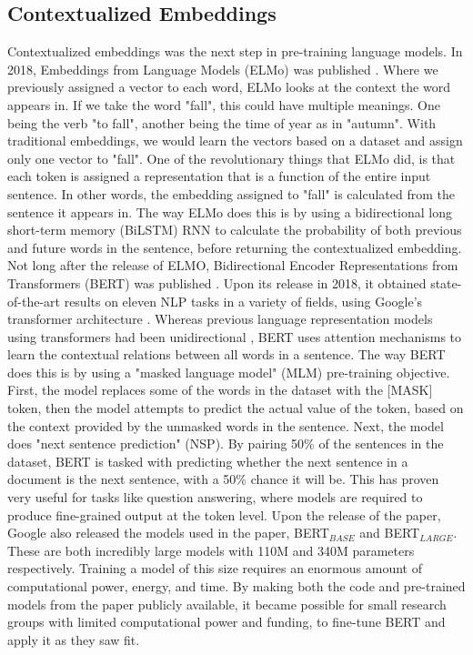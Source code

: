 \documentclass{report}
\begin{document}
\subsection{Contextualized Embeddings}
Contextualized embeddings was the next step in pre-training language models. In 2018, Embeddings from Language Models (ELMo) was published \cite{Peters:2018}. Where we previously assigned a vector to each word, ELMo looks at the context the word appears in. If we take the word "fall", this could have multiple meanings. One being the verb "to fall", another being the time of year as in "autumn". With traditional embeddings, we would learn the vectors based on a dataset and assign only one vector to "fall". One of the revolutionary things that ELMo did, is that each token is assigned a representation that is a function of the entire input sentence. In other words, the embedding assigned to "fall" is calculated from the sentence it appears in. The way ELMo does this is by using a bidirectional long short-term memory (BiLSTM) RNN to calculate the probability of both previous and future words in the sentence, before returning the contextualized embedding.\\
Not long after the release of ELMO, Bidirectional Encoder Representations from Transformers (BERT) was published \cite{DBLP:journals/corr/abs-1810-04805}. Upon its release in 2018, it obtained state-of-the-art results on eleven NLP tasks in a variety of fields, using Google's transformer architecture \cite{DBLP:journals/corr/VaswaniSPUJGKP17}. Whereas previous language representation models using transformers had been unidirectional \cite{radford2018improving}, BERT uses attention mechanisms to learn the contextual relations between all words in a sentence. The way BERT does this is by using a "masked language model" (MLM) pre-training objective. First, the model replaces some of the words in the dataset with the [MASK] token, then the model attempts to predict the actual value of the token, based on the context provided by the unmasked words in the sentence. Next, the model does "next sentence prediction" (NSP). By pairing 50\% of the sentences in the dataset, BERT is tasked with predicting whether the next sentence in a document is the next sentence, with a 50\% chance it will be. This has proven very useful for tasks like question answering, where models are required to produce fine-grained output at the token level. Upon the release of the paper, Google also released the models used in the paper, BERT$_{BASE}$ and BERT$_{LARGE}$. These are both incredibly large models with 110M and 340M parameters respectively. Training a model of this size requires an enormous amount of computational power, energy, and time. By making both the code and pre-trained models from the paper publicly available, it became possible for small research groups with limited computational power and funding, to fine-tune BERT and apply it as they saw fit.
\end{document}
